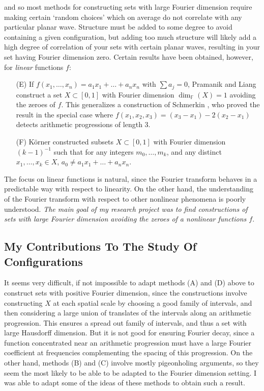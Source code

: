 \documentclass[11pt]{article}
\begin{document}
and so most methods for constructing sets with large Fourier dimension require making certain `random choices' which on average do not correlate with any particular planar wave. Structure must be added to some degree to avoid containing a given configuration, but adding too much structure will likely add a high degree of correlation of your sets with certain planar waves, resulting in your set having Fourier dimension zero. Certain results have been obtained, however, for \emph{linear} functions $f$:
%
\begin{itemize}
	\item[(E)] If $f(x_1,\dots,x_n) = a_1x_1 + \dots + a_nx_n$ with $\sum a_j = 0$, Pramanik and Liang \cite{PramanikLiang} construct a set $X \subset [0,1]$ with Fourier dimension $\dim_{\mathbb{F}}(X) = 1$ avoiding the zeroes of $f$. This generalizes a construction of Schmerkin \cite{Schmerkin}, who proved the result in the special case where $f(x_1,x_2,x_3) = (x_3 - x_1) - 2 (x_2 - x_1)$ detects arithmetic progressions of length 3.

	\item[(F)] K\"{o}rner constructed subsets $X \subset [0,1]$ with Fourier dimension $(k-1)^{-1}$ such that for any integers $m_0,\dots,m_k$, and any distinct $x_1,\dots,x_k \in X$, $a_0 \neq a_1x_1 + \dots + a_nx_n$.
\end{itemize}
%
The focus on linear functions is natural, since the Fourier transform behaves in a predictable way with respect to linearity. On the other hand, the understanding of the Fourier transform with respect to other nonlinear phenomena is poorly understood. \emph{The main goal of my research project was to find constructions of sets with large Fourier dimension avoiding the zeroes of a nonlinear functions $f$}.

\subsection{My Contributions To The Study Of Configurations} \label{MyContributionFractals}

It seems very difficult, if not impossible to adapt methods (A) and (D) above to construct sets with positive Fourier dimension, since the constructions involve constructing $X$ at each spatial scale by choosing a good family of intervals, and then considering a large union of translates of the intervals along an arithmetic progression. This ensures a spread out family of intervals, and thus a set with large Hausdorff dimension. But it is not good for ensuring Fourier decay, since a function concentrated near an arithmetic progression must have a large Fourier coefficient at frequencies complementing the spacing of this progression. On the other hand, methods (B) and (C) involve mostly pigeonholing arguments, so they seem the most likely to be able to be adapted to the Fourier dimension setting. I was able to adapt some of the ideas of these methods to obtain such a result.
\end{document}
